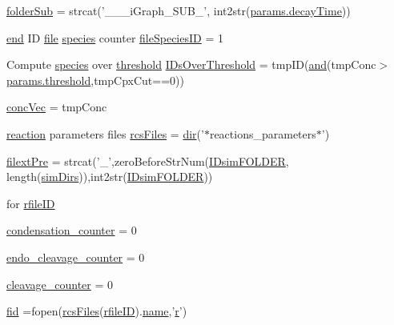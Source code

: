 \begin{DoxyCompactItemize}
\item 
\hyperlink{a00028_a05c5bf0305e5d58d4dc25bd89a025678}{folder\+Sub} = strcat('\+\_\+\+\_\+\_\+i\+Graph\+\_\+\+S\+U\+B\+\_\+', int2str(\hyperlink{a00036_afb6aa83fb78c663f3b39be2380842a8b}{params.\+decay\+Time}))
\item 
\hyperlink{a00025_afb358f48b1646c750fb9da6c6585be2b}{end} I\+D \hyperlink{a00110_a4e8353d6c62cf54bf4a1a8f63e56b8c3}{file} \hyperlink{a00021}{species} counter \hyperlink{a00028_aac959c2e94c26a03fa03966f9cec127e}{file\+Species\+I\+D} = 1
\item 
Compute \hyperlink{a00021}{species} over \hyperlink{a00036_aa022cbb28f80299d572def08e7a5ccfd}{threshold} \hyperlink{a00028_a67c695f856b6731644c6a128e602a323}{I\+Ds\+Over\+Threshold} = tmp\+I\+D(\hyperlink{a00028_a170f8acb213f91bf71c77b1d20bceb33}{and}(tmp\+Conc$>$\hyperlink{a00036_aa022cbb28f80299d572def08e7a5ccfd}{params.\+threshold},tmp\+Cpx\+Cut==0))
\item 
\hyperlink{a00028_a5cb5865443d8f156213280c070385e0d}{conc\+Vec} = tmp\+Conc
\item 
\hyperlink{a00028_a4ba2ecb46f808729569ecce2cc1d34c6}{reaction} parameters files \hyperlink{a00028_aa7a414dad4901fc05688608a49adfd7e}{rcs\+Files} = \hyperlink{a00113_a4ca269cf93df1b512b52174c1a256fe5}{dir}('$\ast$reactions\+\_\+parameters$\ast$')
\item 
\hyperlink{a00028_a527736a425f4f7ead2c2dc9d7b479346}{filext\+Pre} = strcat('\+\_\+',zero\+Before\+Str\+Num(\hyperlink{a00028_aeef3e34bd64eec758eac16f004cdcef0}{I\+Dsim\+F\+O\+L\+D\+E\+R}, length(\hyperlink{a00031_aae5035eb84b89176ed5b06e136325eff}{sim\+Dirs})),int2str(\hyperlink{a00028_aeef3e34bd64eec758eac16f004cdcef0}{I\+Dsim\+F\+O\+L\+D\+E\+R}))
\item 
for \hyperlink{a00028_a2773ef160060ce8adead229154219112}{rfile\+I\+D}
\item 
\hyperlink{a00028_adad395e0a0c736c2818d52c1100d4f31}{condensation\+\_\+counter} = 0
\item 
\hyperlink{a00028_aac101310701750e7d113b83271c1b982}{endo\+\_\+cleavage\+\_\+counter} = 0
\item 
\hyperlink{a00028_ab1f4c307f0935bb99adb3036a2936b5e}{cleavage\+\_\+counter} = 0
\item 
\hyperlink{a00028_ae9011d40c6f13e68e6f07156e0da7c5d}{fid} =fopen(\hyperlink{a00028_aa7a414dad4901fc05688608a49adfd7e}{rcs\+Files}(\hyperlink{a00028_a2773ef160060ce8adead229154219112}{rfile\+I\+D}).\hyperlink{a00027_abbf559a76fab59203496b0847ab9502a}{name},'\hyperlink{a00031_ac862e7284527eb913b1351c8bfb8e079}{r}')

\end{DoxyCompactItemize}
